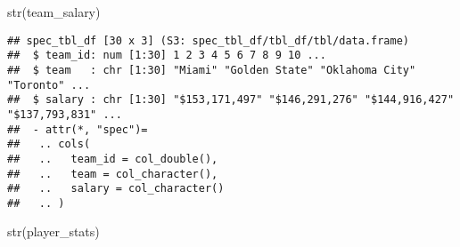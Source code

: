\documentclass[
]{article}
\newenvironment{Shaded}{\begin{snugshade}}{\end{snugshade}}
\newcommand{\FunctionTok}[1]{\textcolor[rgb]{0.00,0.00,0.00}{#1}}
\newcommand{\NormalTok}[1]{#1}
\begin{document}
\begin{Shaded}
\begin{Highlighting}[]
\FunctionTok{str}\NormalTok{(team\_salary)}
\end{Highlighting}
\end{Shaded}

\begin{verbatim}
## spec_tbl_df [30 x 3] (S3: spec_tbl_df/tbl_df/tbl/data.frame)
##  $ team_id: num [1:30] 1 2 3 4 5 6 7 8 9 10 ...
##  $ team   : chr [1:30] "Miami" "Golden State" "Oklahoma City" "Toronto" ...
##  $ salary : chr [1:30] "$153,171,497" "$146,291,276" "$144,916,427" "$137,793,831" ...
##  - attr(*, "spec")=
##   .. cols(
##   ..   team_id = col_double(),
##   ..   team = col_character(),
##   ..   salary = col_character()
##   .. )
\end{verbatim}

\begin{Shaded}
\begin{Highlighting}[]
\FunctionTok{str}\NormalTok{(player\_stats)}
\end{Highlighting}
\end{Shaded}
\end{document}

